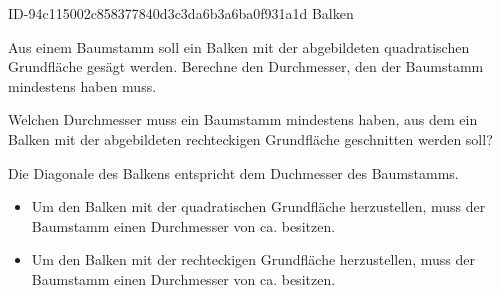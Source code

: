\begin{exercise}
      {ID-94c115002c858377840d3c3da6b3a6ba0f931a1d}
      {Balken}
  \ifproblem\problem
    \begin{minipage}[c]{0.20\linewidth}
      \centering
    \end{minipage}\hfill
    \begin{minipage}[c]{0.79\linewidth}
    Aus einem Baumstamm soll ein Balken mit der abgebildeten quadratischen
    Grundfläche gesägt werden. Berechne den Durchmesser, den der Baumstamm
    mindestens haben muss.
    \end{minipage}\par
    \begin{minipage}[c]{0.20\linewidth}
      \centering
    \end{minipage}\hfill
    \begin{minipage}[c]{0.79\linewidth}
    Welchen Durchmesser muss ein Baumstamm mindestens haben, aus dem
    ein Balken mit der abgebildeten rechteckigen Grundfläche geschnitten
    werden soll?
    \end{minipage}
  \fi
  \ifoutline\outline
    Die Diagonale des Balkens entspricht dem Duchmesser des Baumstamms.
  \fi
  \ifoutcome\outcome
    \begin{itemize}
      \item Um den Balken mit der quadratischen Grundfläche herzustellen,
            muss der Baumstamm einen Durchmesser von ca.  besitzen.
      \item Um den Balken mit der rechteckigen Grundfläche herzustellen,
            muss der Baumstamm einen Durchmesser von ca.  besitzen.
    \end{itemize}
  \fi
\end{exercise}

